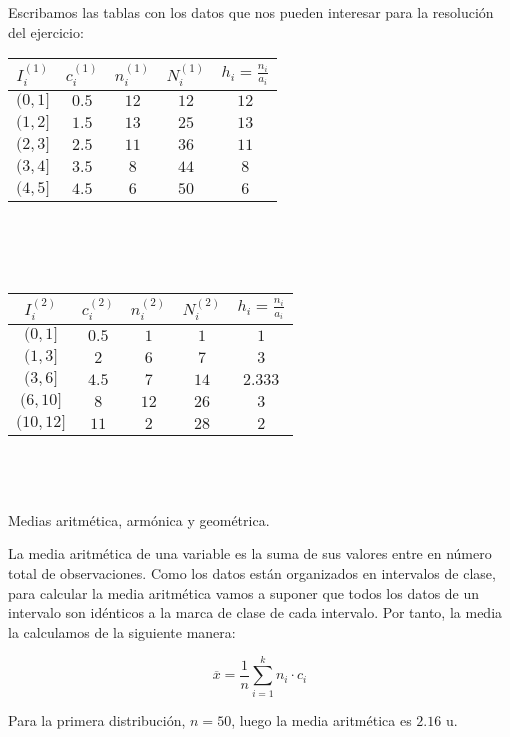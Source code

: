 Escribamos las tablas con los datos que nos pueden interesar para la resolución del ejercicio: \\

\begin{tabular}{| c | c | c | c | c |}
	\hline
	$I_i^{(1)}$ & $c_i^{(1)}$ & $n_i^{(1)}$ & $N_i^{(1)}$ & $h_{i} = \frac{n_{i}}{a_{i}}$ \\ \hline
	$(0, 1]$ & $0.5$ & $12$ & $12$ & $12$ \\
	$(1, 2]$ & $1.5$ & $13$ & $25$ & $13$  \\
	$(2, 3]$ & $2.5$ & $11$ & $36$ & $11$  \\
	$(3, 4]$ & $3.5$ & $8$ & $44$  & $8$   \\
	$(4, 5]$ & $4.5$ & $6$ & $50$  & $6$ \\ \hline
	
\end{tabular} \\\\\\

\begin{tabular}{| c | c | c | c | c |}
	\hline
	$I_i^{(2)}$ & $c_i^{(2)}$ & $n_i^{(2)}$ & $N_i^{(2)} $ & $h_{i} = \frac{n_{i}}{a_{i}}$ \\ \hline
	$(0, 1]$ & $0.5$ & $1$ & $1$ & $1$ \\
	$(1, 3]$ & $2$ & $6$ & $7$ & $3$ \\
	$(3, 6]$ & $4.5$ & $7$ & $14$ & $2.333$ \\
	$(6, 10]$ & $8$ & $12$ & $26$ & $3$ \\
	$(10, 12]$ & $11$ & $2$ & $28$ & $2$ \\ \hline
	
\end{tabular}\\
\\ 
\\
\subproblem
Medias aritm{\'e}tica, arm{\'o}nica y geom{\'e}trica.

La media aritmética de una variable es la suma de sus valores entre en número total de observaciones. Como los datos están organizados en intervalos de clase, para calcular la media aritmética vamos a suponer que todos los datos de un intervalo son idénticos a la marca de clase de cada intervalo. Por tanto, la media la calculamos de la siguiente manera: 
	
	$$\overline{x} = \dfrac{1}{n}\sum_{i=1}^{k}n_i·c_i$$


Para la primera distribución, $n = 50$, luego la media aritmética es $2.16$ u. 

